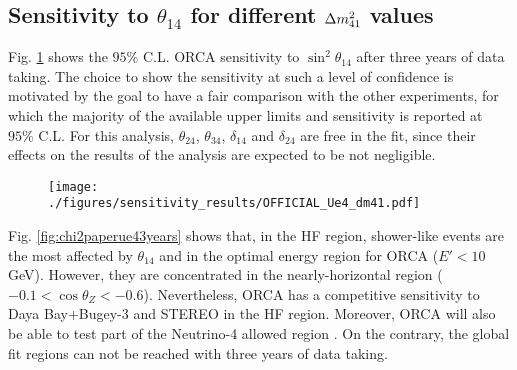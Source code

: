 \subsection{Sensitivity to $\theta_{14}$ for different $\Delta m^2_{41}$ values}
Fig. \ref{fig:sen-Ue} shows the $95\%$ C.L. ORCA sensitivity to $\sin^2\theta_{14}$ after three years of data taking. The choice to show the sensitivity at such a level of confidence is motivated by the goal to have a fair comparison with the other experiments, for which the majority of the available upper limits and sensitivity is reported at $95\%$ C.L. For this analysis, $\theta_{24}$, $\theta_{34}$, $\delta_{14}$ and $\delta_{24}$ are free in the fit, since their effects on the results of the analysis are expected to be not negligible.
\begin{figure}[H]
\centering
\texttt{[image: ./figures/sensitivity\_results/OFFICIAL\_Ue4\_dm41.pdf]}
\label{fig:sen-Ue}
\end{figure}
Fig. \ref{fig:chi2paperue43years} shows that, in the HF region, shower-like events are the most affected by $\theta_{14}$ and in the optimal energy region for ORCA ($E' < 10$ GeV). However, they are concentrated in the nearly-horizontal region ($-0.1 <\cos\theta_{Z} < -0.6$). Nevertheless, ORCA has a competitive sensitivity to Daya Bay+Bugey-3 \cite{numu_disapp_minos} and STEREO \cite{stereo_b} in the HF region. Moreover, ORCA will also be able to test part of the Neutrino-4 allowed region \cite{neutrino-4}. On the contrary, the global fit regions can not be reached with three years of data taking.

